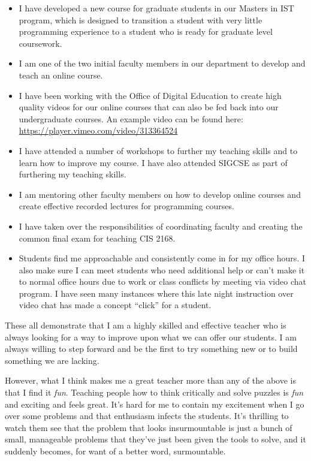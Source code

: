 \documentclass[10pt]{article}
\begin{document}
\begin{itemize}
	 
	\item I have  developed a new course for graduate students in our Masters in IST program, which is designed to transition a student with very little programming experience to a student who is ready for graduate level coursework.
	\item I am one of the two initial faculty members in our department to develop and teach an online course.
	\item I have been working with the Office of Digital Education to create high quality videos for our online courses that can also be fed back into our undergraduate courses.  An example video can be found here: \url{https://player.vimeo.com/video/313364524}
	\item I have attended a number of workshops to further my teaching skills and to learn how to improve my course.  I have also attended SIGCSE as part of furthering my teaching skills.
	\item I am mentoring other faculty members on how to develop online courses and create effective recorded lectures for programming courses.
	\item I have taken over the responsibilities of coordinating faculty  and creating the common  final exam for teaching CIS 2168.
	\item Students find me approachable and consistently come in for my office hours.  I also make sure I can meet students who need additional help or can't make it to normal office hours due to work or class conflicts by  meeting via video chat program.   I have seen many instances where this late night instruction over video chat has made a concept ``click'' for a student.
\end{itemize}


These all demonstrate that I am a highly skilled and effective teacher who is always looking for a way to improve upon what we can offer our students. I am always willing to step forward and be the first to try something new or to build something we are lacking.

However, what I think makes me a great teacher more than any of the above is that I find it \textit{fun}.  
Teaching people how to think critically and solve puzzles is \textit{fun} and exciting and feels great.
It's hard for me to contain my excitement when I go  over some problems and that enthusiasm infects the students.
It's thrilling to watch them see that the problem that looks insurmountable is just a bunch of small, manageable problems that they've just been given the tools to solve,  and it suddenly becomes, for want of a better word, surmountable.
\end{document}

